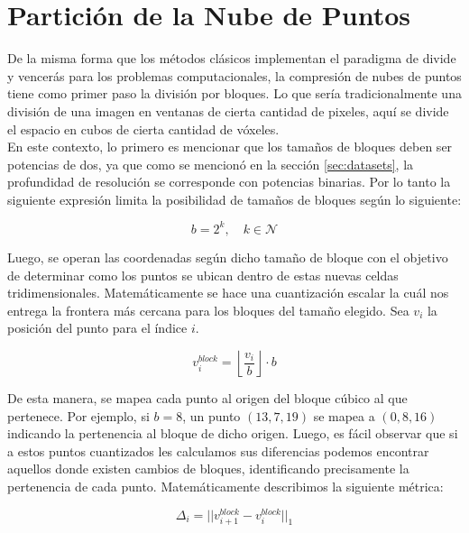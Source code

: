 \section{Partición de la Nube de Puntos} \label{sec:pc_partition}
    De la misma forma que los métodos clásicos implementan el paradigma de divide y vencerás para los problemas computacionales, la compresión de nubes de puntos tiene como primer paso la división por bloques. Lo que sería tradicionalmente una división de una imagen en ventanas de cierta cantidad de pixeles, aquí se divide el espacio en cubos de cierta cantidad de vóxeles.\\

    En este contexto, lo primero es mencionar que los tamaños de bloques deben ser potencias de dos, ya que como se mencionó en la sección \ref{sec:datasets}, la profundidad de resolución se corresponde con potencias binarias. Por lo tanto la siguiente expresión limita la posibilidad de tamaños de bloques según lo siguiente:

    \begin{equation}
        b = 2^k, \quad k \in \mathcal{N}
    \end{equation}

    Luego, se operan las coordenadas según dicho tamaño de bloque con el objetivo de determinar como los puntos se ubican dentro de estas nuevas celdas tridimensionales. Matemáticamente se hace una cuantización escalar la cuál nos entrega la frontera más cercana para los bloques del tamaño elegido. Sea $v_i$ la posición del punto para el índice $i$.

     \begin{equation}
         v^{block}_i = \left\lfloor \frac{v_i}{b} \right\rfloor \cdot b
     \end{equation}

     De esta manera, se mapea cada punto al origen del bloque cúbico al que pertenece. Por ejemplo, si $b=8$, un punto $(13,7,19)$ se mapea a $(0, 8,16)$ indicando la pertenencia al bloque de dicho origen. Luego, es fácil observar que si a estos puntos cuantizados les calculamos sus diferencias podemos encontrar aquellos donde existen cambios de bloques, identificando precisamente la pertenencia de cada punto. Matemáticamente describimos la siguiente métrica:

     \begin{equation}
         \Delta _i = || v^{block}_{i+1} - v^{block}_i ||_1
     \end{equation}


